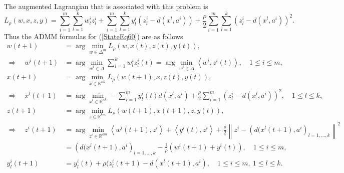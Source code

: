 \documentclass[11pt]{article}
\numberwithin{equation}{section}
\begin{document}
The augmented Lagrangian that is associated with this problem is 
\begin{equation}
	L_{\rho}(w,x,z,y) = \sum\limits_{i=1}^{m} \sum\limits_{l=1}^{k} w^i_l z^i_l + \sum\limits_{i=1}^{m} \sum\limits_{l=1}^{k} y^i_l (z^i_l - d(x^l,a^i)) + \frac{\rho}{2} \sum\limits_{i=1}^{m} \sum\limits_{l=1}^{k} \left(z^i_l - d(x^l,a^i)\right)^2 . \label{StateEq59}
\end{equation}
Thus the ADMM formulas for (\ref{StateEq60}) are as follows
\begin{equation*}
\begin{split}
	w(t+1) &= \arg\min\limits_{w \in \Delta^m} L_{\rho}(w,x(t),z(t),y(t)), \\
	\Rightarrow \quad w^i(t+1) &= \arg\min\limits_{w^i \in \Delta} \sum\limits_{l=1}^{k} w^i_l z^i_l(t) = \arg\min\limits_{w^i \in \Delta} \left\langle w^i, z^i(t) \right\rangle, \quad 1 \leq i \leq m , \\
	x(t+1) &= \arg\min\limits_{x \in \mathbb{R}^{nk}} L_{\rho}(w(t+1),x,z(t),y(t)), \\
	\Rightarrow \quad x^l(t+1) &= \arg\min\limits_{x^l \in \mathbb{R}^{nk}} -\sum\limits_{i=1}^{m} y^i_l(t) d(x^l, a^i) + \frac{\rho}{2} \sum\limits_{i=1}^{m} \left(z^i_l - d(x^l,a^i)\right)^2, \quad 1 \leq l \leq k , \\
	z(t+1) &= \arg\min\limits_{z \in \mathbb{R}^{km}} L_{\rho}(w(t+1),x(t+1),z,y(t)), \\
	\Rightarrow \quad z^i(t+1) &= \arg\min\limits_{z^i \in \mathbb{R}^{km}} \left\langle w^i(t+1), z^i \right\rangle +  \left\langle y^i(t), z^i \right\rangle + \frac{\rho}{2} \left\lVert z^i - \left( d(x^l(t+1), a^i \right)_{l=1, \ldots , k} \right\lVert^2 \\
	&= \left(d(x^l(t+1), a^i \right)_{l=1, \ldots , k} - \frac{1}{\rho}\left( w^i(t+1) + y^i(t) \right), \quad 1 \leq i \leq m, \\
	y^i_l(t+1) &= y^i_l(t) + \rho (z^i_l(t+1) - d(x^l(t+1), a^i), \quad 1 \leq i \leq m, \: 1 \leq l \leq k.
\end{split}
\end{equation*}


\end{document}
